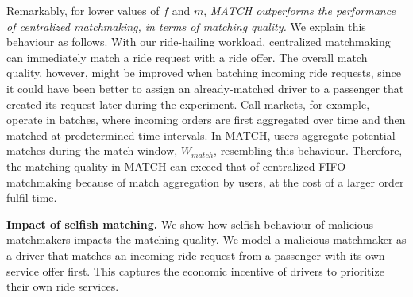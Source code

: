 Remarkably, for lower values of $ f $ and $ m $, \emph{MATCH outperforms the performance of centralized matchmaking, in terms of matching quality.}
We explain this behaviour as follows.
With our ride-hailing workload, centralized matchmaking can immediately match a ride request with a ride offer.
The overall match quality, however, might be improved when batching incoming ride requests, since it could have been better to assign an already-matched driver to a passenger that created its request later during the experiment.
Call markets, for example, operate in batches, where incoming orders are first aggregated over time and then matched at predetermined time intervals.
In MATCH, users aggregate potential matches during the match window, $ W_{match} $, resembling this behaviour.
Therefore, the matching quality in MATCH can exceed that of centralized FIFO matchmaking because of match aggregation by users, at the cost of a larger order fulfil time.

\textbf{Impact of selfish matching.}
We show how selfish behaviour of malicious matchmakers impacts the matching quality.
We model a malicious matchmaker as a driver that matches an incoming ride request from a passenger with its own service offer first.
This captures the economic incentive of drivers to prioritize their own ride services.

